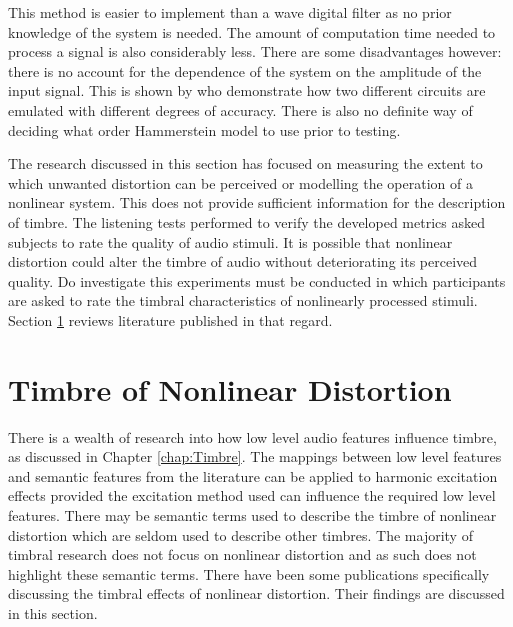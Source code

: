 			This method is easier to implement than a wave digital filter as no prior knowledge of the system is
			needed. The amount of computation time needed to process a signal is also considerably less.  There
			are some disadvantages however: there is no account for the dependence of the system on the
			amplitude of the input signal. This is shown by \citet{novak2010analysis} who demonstrate how two
			different circuits are emulated with different degrees of accuracy. There is also no definite way of
			deciding what order Hammerstein model to use prior to testing.

			The research discussed in this section has focused on measuring the extent to which unwanted
			distortion can be perceived or modelling the operation of a nonlinear system. This does not provide
			sufficient information for the description of timbre. The listening tests performed to verify the
			developed metrics asked subjects to rate the quality of audio stimuli. It is possible that nonlinear
			distortion could alter the timbre of audio without deteriorating its perceived quality. Do
			investigate this experiments must be conducted in which participants are asked to rate the timbral
			characteristics of nonlinearly processed stimuli. Section \ref{sec:Excitation-Timbre} reviews
			literature published in that regard.

\section{Timbre of Nonlinear Distortion}
\label{sec:Excitation-Timbre}

	There is a wealth of research into how low level audio features influence timbre, as discussed in Chapter
	\ref{chap:Timbre}. The mappings between low level features and semantic features from the literature can be applied
	to harmonic excitation effects provided the excitation method used can influence the required low level features.
	There may be semantic terms used to describe the timbre of nonlinear distortion which are seldom used to describe
	other timbres. The majority of timbral research does not focus on nonlinear distortion and as such does not
	highlight these semantic terms. There have been some publications specifically discussing the timbral effects of
	nonlinear distortion. Their findings are discussed in this section.

